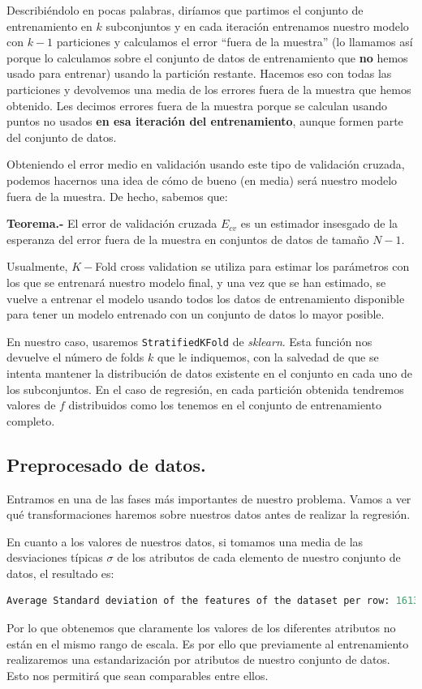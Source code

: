\documentclass[a4paper, 20pt]{article}
\begin{document}
Describiéndolo en pocas palabras, diríamos que partimos el conjunto de entrenamiento en $k$ subconjuntos y en cada iteración entrenamos nuestro modelo
con $k-1$ particiones y calculamos el error ``fuera de la muestra'' (lo llamamos así porque lo calculamos sobre el conjunto de datos de entrenamiento que \textbf{no} hemos usado para entrenar) usando la partición restante. Hacemos eso con todas las particiones y devolvemos una media de
los errores fuera de la muestra que hemos obtenido. Les decimos errores fuera de la muestra porque se calculan usando puntos no usados \textbf{en esa iteración del entrenamiento},
aunque formen parte del conjunto de datos.

Obteniendo el error medio en validación usando este tipo de validación cruzada, podemos hacernos una idea de cómo de bueno (en media) será nuestro modelo fuera de la muestra. De hecho, sabemos que:

\textbf{Teorema.-} El error de validación cruzada $E_{cv}$ es un estimador insesgado de la esperanza del error fuera de la muestra en conjuntos de datos de tamaño $N-1$.

Usualmente, $K-$Fold cross validation se utiliza para estimar los parámetros con los que se entrenará nuestro modelo final, y una vez que se han estimado, se vuelve a entrenar el modelo usando
todos los datos de entrenamiento disponible para tener un modelo entrenado con un conjunto de datos lo mayor posible.


En nuestro caso, usaremos \lstinline{StratifiedKFold} de \emph{sklearn}. Esta función nos devuelve el número de folds $k$ que le indiquemos, con la salvedad de que se intenta mantener la distribución de datos existente en el conjunto en cada uno de los subconjuntos. En el caso de regresión, en cada partición obtenida tendremos valores de $f$ distribuidos como los tenemos en el conjunto de entrenamiento completo.

\subsection{Preprocesado de datos.}

Entramos en una de las fases más importantes de nuestro problema. Vamos a ver qué transformaciones haremos sobre nuestros datos antes de realizar la regresión.


En cuanto a los valores de nuestros datos, si tomamos una media de las desviaciones típicas $\sigma$ de los atributos de cada elemento de nuestro conjunto de datos, el resultado es:
\begin{lstlisting}[language = Python]
  Average Standard deviation of the features of the dataset per row: 1613.81306
\end{lstlisting}
Por lo que obtenemos que claramente los valores de los diferentes atributos no están en el mismo rango de escala. Es por ello que previamente al entrenamiento realizaremos una estandarización por atributos de nuestro conjunto de datos. Esto nos permitirá que sean comparables entre ellos.
\end{document}
